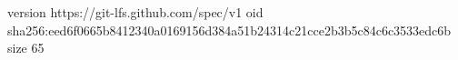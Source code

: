 version https://git-lfs.github.com/spec/v1
oid sha256:eed6f0665b8412340a0169156d384a51b24314c21cce2b3b5c84c6c3533edc6b
size 65
